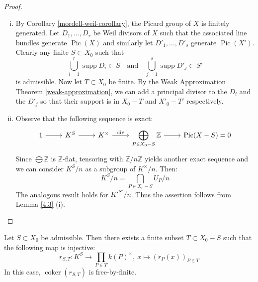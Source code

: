 \begin{proof}
\begin{enumerate}[(i)]
\item By Corollary \ref{mordell-weil-corollary}, the Picard group of $X$ is finitely generated. Let $D_1,\ldots, D_r$ be Weil divisors of $X$ such that the associated line bundles generate $\operatorname{Pic}(X)$ and similarly let $D'_1,\ldots,D'_s$ generate $\operatorname{Pic}(X')$. Clearly any finite $S\subset X_0$ such that
\[ \bigcup_{i=1}^r \operatorname{supp}D_i\subset S\quad\text{and}\quad \bigcup_{j=1}^s\operatorname{supp}D'_j\subset S' \]
is admissible. Now let $T\subset X_0$ be finite. By the Weak Approximation Theorem \ref{weak-approximation}, we can add a principal divisor to the $D_i$ and the $D'_j$ so that their support is in $X_0 -  T$ and $X'_0 -  T'$ respectively.
\item Observe that the following sequence is exact:
\[ \begin{tikzcd}
1 \ar[r] & K^S \ar[r]& K^\times \ar[r, "\operatorname{div}"]& \displaystyle \bigoplus_{P\in X_0 -  S}\mathbb{Z} \ar[r]& \operatorname{Pic}(X -  S) = 0
\end{tikzcd} \]
Since $\bigoplus\mathbb{Z}$ is $\mathbb{Z}$-flat, tensoring with $\mathbb{Z}/n\mathbb{Z}$ yields another exact sequence and we can consider $K^S/n$ as a subgroup of $K^\times/n$. Then:
\[ K^S/n = \bigcap_{P\in X_0 -  S}U_P/n \]
The analogous result holds for $K'^{S'}/n$. Thus the assertion follows from Lemma \ref{4.3} (i).\qedhere
\end{enumerate}
\end{proof}

\begin{lemma}\label{5.4}
Let $S\subset X_0$ be admissible. Then there exists a finite subset $T\subset X_0 -  S$ such that the following map is injective:
\[ r_{S,T}:K^S \to\prod_{P\in T}k(P)^\times,\ x\mapsto(r_P(x))_{P\in T} \]
In this case, $\operatorname{coker}(r_{S,T})$ is free-by-finite.
\end{lemma}

